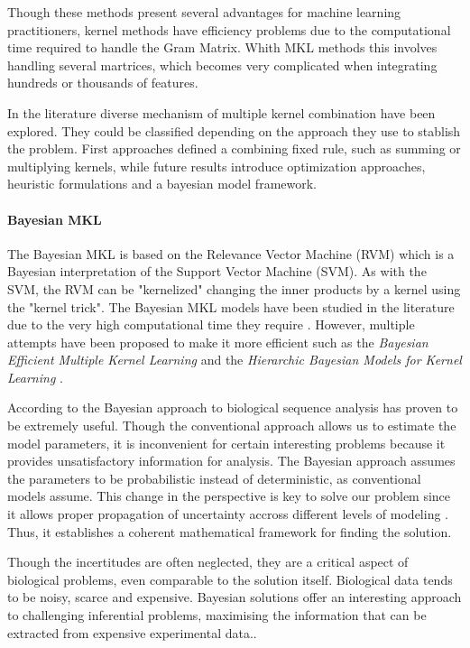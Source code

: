 \documentclass[11pt,a4paper]{article}
\begin{document}
Though these methods present several advantages for machine learning practitioners, kernel methods have efficiency problems due to the computational time required to handle the Gram Matrix. Whith MKL methods this involves handling several martrices, which becomes very complicated when integrating hundreds or thousands of features. 

In the literature diverse mechanism of multiple kernel combination have been explored. They could be classified depending on the approach they use to stablish the problem. First approaches defined a combining fixed rule, such as summing or multiplying kernels, while future results introduce optimization approaches, heuristic formulations and a bayesian model framework. 

\paragraph{Bayesian MKL}
The Bayesian MKL is based on the Relevance Vector Machine (RVM) which is a Bayesian interpretation of the Support Vector Machine (SVM). As with the SVM, the RVM can be "kernelized" changing the inner products by a kernel using the "kernel trick". The Bayesian MKL models have been studied in the literature due to the very high computational time they require \cite{gonen2012bayesian}. However, multiple attempts have been proposed to make it more efficient such as the \textit{Bayesian Eﬃcient Multiple Kernel Learning} \cite{gonen2012bayesian} and the \textit{Hierarchic Bayesian Models for Kernel Learning} \cite{girolami2005hierarchic}. 

According to \cite{Wilkinson2007} the Bayesian approach to biological sequence analysis has proven to be extremely useful. Though the conventional approach allows us to estimate the model parameters, it is inconvenient for certain interesting problems because it provides unsatisfactory information for analysis. The Bayesian approach assumes the parameters to be probabilistic instead of deterministic, as conventional models assume. This change in the perspective is key to solve our problem since it allows proper propagation of uncertainty accross different levels of modeling \cite{Wilkinson2007}. Thus, it establishes a coherent mathematical framework for finding the solution.

Though the incertitudes are often neglected, they are a critical aspect of biological problems, even comparable to the solution itself. Biological data tends to be noisy, scarce and expensive. Bayesian solutions offer an interesting approach to challenging inferential problems, maximising the information that can be extracted from expensive experimental data.\cite{Wilkinson2007}.
\end{document}

